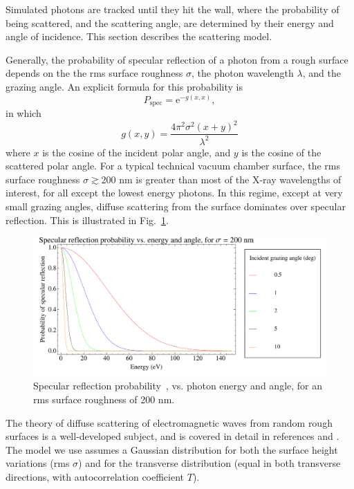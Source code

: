 \documentclass[11pt]{article}
\begin{document}
Simulated photons are tracked until they hit the wall, where the
probability of being scattered, and the scattering angle, are
determined by their energy and angle of incidence.  This section
describes the scattering model.

Generally, the probability of specular reflection of a photon from a
rough surface depends on the the rms surface roughness $\sigma$, the
photon wavelength $\lambda$, and the grazing angle. An explicit
formula for this probability is~\cite{b:beckmann}
   \begin{equation}
P_{\textrm{spec}}=\textrm{e}^{-g(x,x)},
\end{equation}
in which
   \begin{equation}
g(x,y)=\frac{4\pi^{2}\sigma^{2}(x+y)^{2}}{\lambda^{2}}
  \end{equation}
where $x$ is the cosine of the incident polar angle, and $y$ is the
cosine of the scattered polar angle. For a typical technical vacuum
chamber surface, the rms surface roughness $\sigma \gtrsim 200$ nm is
greater than most of the X-ray wavelengths of interest, for all except
the lowest energy photons. In this regime, except at very small
grazing angles, diffuse scattering from the surface dominates over
specular reflection. This is illustrated in Fig.~\ref{f:spec.prob}.
  \begin{figure}
  \centering
  \includegraphics[width=6in]{specular-probability.pdf}
  \caption[Specular reflection probability vs. photon energy and angle]
{\label{f:spec.prob}
Specular reflection probability~\cite{b:beckmann}, vs. photon energy
and angle, for an rms surface roughness of 200 nm.}
  \end{figure}
   
The theory of diffuse scattering of electromagnetic waves from random
rough surfaces is a well-developed subject, and is covered in detail
in references \cite{b:beckmann} and \cite{b:ogilvy}. The model we use
assumes a Gaussian distribution for both the surface height variations
(rms $\sigma$) and for the transverse distribution (equal in both
transverse directions, with autocorrelation coefficient $T$).
\end{document}
